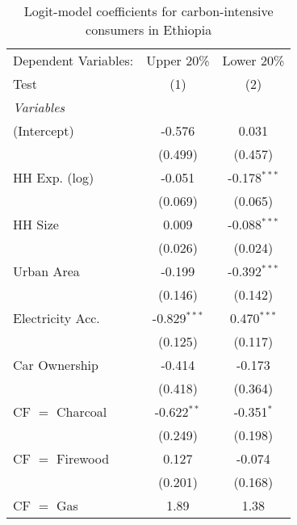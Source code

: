 
\begin{table}[htbp!]
   \centering
   \small
   \begin{adjustbox}{width = 1\textwidth, max height = 0.95\textheight, center}
      \begin{threeparttable}[b]
         \caption{\label{tab:Logit_1_ETH} Logit-model coefficients for carbon-intensive consumers in Ethiopia}
         \begin{tabular}{lcc}
            \tabularnewline \midrule \midrule
            Dependent Variables: & Upper 20\%     & Lower 20\%\\   
            Test                 & (1)            & (2)\\  
            \midrule
            \emph{Variables}\\
            (Intercept)          & -0.576         & 0.031\\   
                                 & (0.499)        & (0.457)\\   
            HH Exp. (log)        & -0.051         & -0.178$^{***}$\\   
                                 & (0.069)        & (0.065)\\   
            HH Size              & 0.009          & -0.088$^{***}$\\   
                                 & (0.026)        & (0.024)\\   
            Urban Area           & -0.199         & -0.392$^{***}$\\   
                                 & (0.146)        & (0.142)\\   
            Electricity Acc.     & -0.829$^{***}$ & 0.470$^{***}$\\   
                                 & (0.125)        & (0.117)\\   
            Car Ownership        & -0.414         & -0.173\\   
                                 & (0.418)        & (0.364)\\   
            CF $=$ Charcoal      & -0.622$^{**}$  & -0.351$^{*}$\\   
                                 & (0.249)        & (0.198)\\   
            CF $=$ Firewood      & 0.127          & -0.074\\   
                                 & (0.201)        & (0.168)\\   
            CF $=$ Gas           & 1.89           & 1.38\\   

\end{tabular}
\end{threeparttable}
\end{adjustbox}
\end{table}
